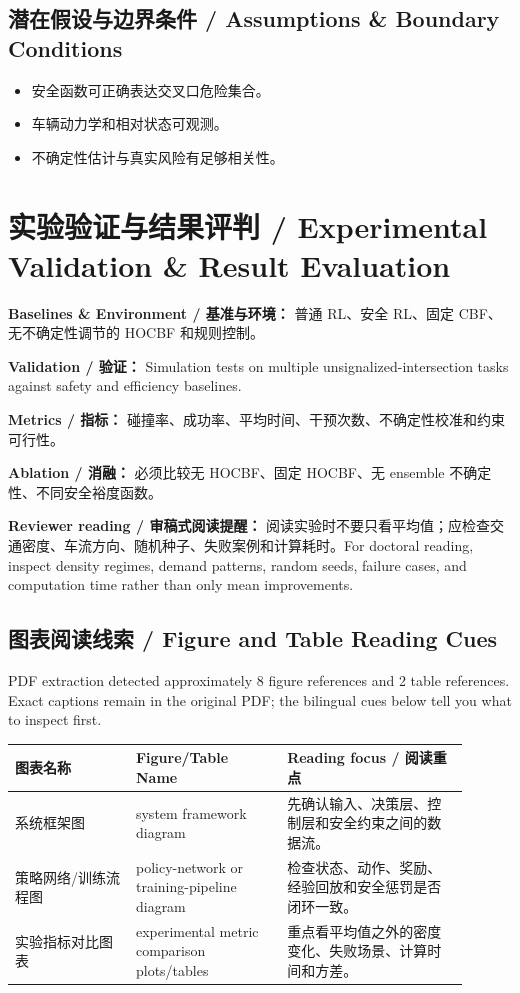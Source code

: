 \documentclass[UTF8,a4paper,11pt,fontset=fandol]{ctexart}
\begin{document}
\subsection{潜在假设与边界条件 / Assumptions \& Boundary Conditions}
\begin{itemize}
\item 安全函数可正确表达交叉口危险集合。
\item 车辆动力学和相对状态可观测。
\item 不确定性估计与真实风险有足够相关性。
\end{itemize}


\section{实验验证与结果评判 / Experimental Validation \& Result Evaluation}
\textbf{Baselines \& Environment / 基准与环境：} 普通 RL、安全 RL、固定 CBF、无不确定性调节的 HOCBF 和规则控制。

\textbf{Validation / 验证：} Simulation tests on multiple unsignalized-intersection tasks against safety and efficiency baselines.

\textbf{Metrics / 指标：} 碰撞率、成功率、平均时间、干预次数、不确定性校准和约束可行性。

\textbf{Ablation / 消融：} 必须比较无 HOCBF、固定 HOCBF、无 ensemble 不确定性、不同安全裕度函数。

\textbf{Reviewer reading / 审稿式阅读提醒：} 阅读实验时不要只看平均值；应检查交通密度、车流方向、随机种子、失败案例和计算耗时。For doctoral reading, inspect density regimes, demand patterns, random seeds, failure cases, and computation time rather than only mean improvements.

\subsection{图表阅读线索 / Figure and Table Reading Cues}
PDF extraction detected approximately 8 figure references and 2 table references. Exact captions remain in the original PDF; the bilingual cues below tell you what to inspect first.

\begin{longtable}{p{0.24\linewidth}p{0.30\linewidth}p{0.36\linewidth}}
\toprule
图表名称 & Figure/Table Name & Reading focus / 阅读重点\\
\midrule
系统框架图 & system framework diagram & 先确认输入、决策层、控制层和安全约束之间的数据流。 \\
策略网络/训练流程图 & policy-network or training-pipeline diagram & 检查状态、动作、奖励、经验回放和安全惩罚是否闭环一致。 \\
实验指标对比图表 & experimental metric comparison plots/tables & 重点看平均值之外的密度变化、失败场景、计算时间和方差。 \\
\bottomrule
\end{longtable}
\end{document}
